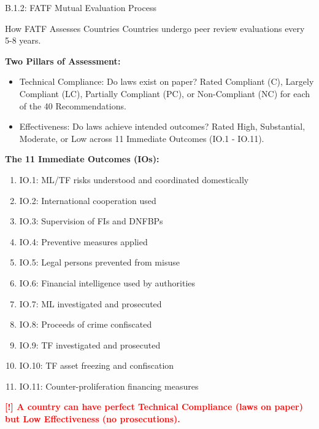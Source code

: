 \documentclass[11pt,a4paper]{beamer}
\newcommand{\redflag}[1]{\textcolor{red}{\textbf{[!] #1}}}
\begin{document}
	\begin{frame}{B.1.2: FATF Mutual Evaluation Process}
		\begin{block}{How FATF Assesses Countries}
			Countries undergo peer review evaluations every 5-8 years.
		\end{block}
		\textbf{Two Pillars of Assessment:}
		\begin{itemize}
			\item Technical Compliance: Do laws exist on paper? Rated Compliant (C), Largely Compliant (LC), Partially Compliant (PC), or Non-Compliant (NC) for each of the 40 Recommendations.
			\item Effectiveness: Do laws achieve intended outcomes? Rated High, Substantial, Moderate, or Low across 11 Immediate Outcomes (IO.1 - IO.11).
		\end{itemize}
		\textbf{The 11 Immediate Outcomes (IOs):}
		\begin{enumerate}
			\item IO.1: ML/TF risks understood and coordinated domestically
			\item IO.2: International cooperation used
			\item IO.3: Supervision of FIs and DNFBPs
			\item IO.4: Preventive measures applied
			\item IO.5: Legal persons prevented from misuse
			\item IO.6: Financial intelligence used by authorities
			\item IO.7: ML investigated and prosecuted
			\item IO.8: Proceeds of crime confiscated
			\item IO.9: TF investigated and prosecuted
			\item IO.10: TF asset freezing and confiscation
			\item IO.11: Counter-proliferation financing measures
		\end{enumerate}
		\redflag{A country can have perfect Technical Compliance (laws on paper) but Low Effectiveness (no prosecutions).}
	\end{frame}
	
\end{document}
